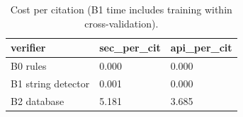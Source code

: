 \begin{table}[t]
\centering
\small
\setlength{\tabcolsep}{3pt}
\caption{Cost per citation (B1 time includes training within cross-validation).}
\label{tab:cost}
\begin{tabular}{lll}
\toprule
verifier & sec\_per\_cit & api\_per\_cit \\
\midrule
B0 rules & 0.000 & 0.000 \\
B1 string detector & 0.001 & 0.000 \\
B2 database & 5.181 & 3.685 \\
\bottomrule
\end{tabular}
\end{table}
